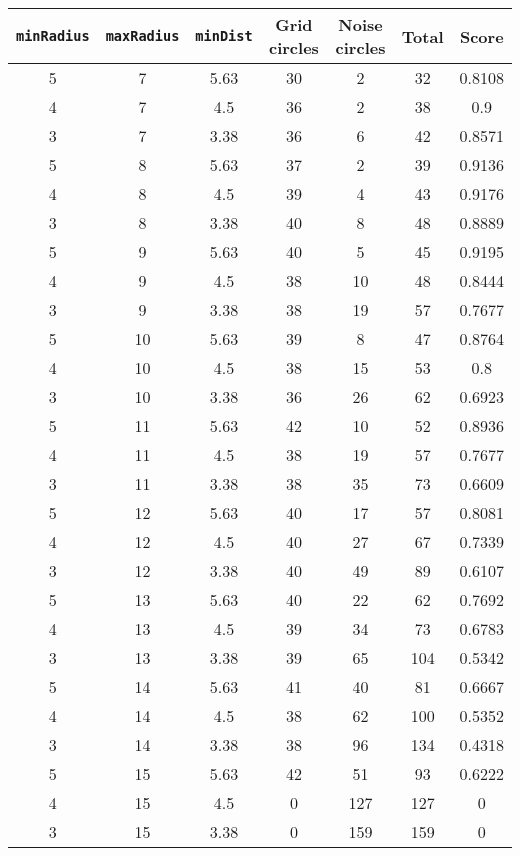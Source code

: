 \documentclass[letterpaper, 12pt]{article}
\begin{document}
\begin{longtable}{|c|c|c|c|c|c|c|}
\hline
\textbf{\texttt{minRadius}} & \textbf{\texttt{maxRadius}} & \textbf{\texttt{minDist}} & \textbf{Grid circles} & \textbf{Noise circles} & \textbf{Total} & \textbf{Score} \\
\hline
5 & 7 & 5.63 & 30 & 2 & 32 & 0.8108 \\
\hline
4 & 7 & 4.5 & 36 & 2 & 38 & 0.9 \\
\hline
3 & 7 & 3.38 & 36 & 6 & 42 & 0.8571 \\
\hline
5 & 8 & 5.63 & 37 & 2 & 39 & 0.9136 \\
\hline
4 & 8 & 4.5 & 39 & 4 & 43 & 0.9176 \\
\hline
3 & 8 & 3.38 & 40 & 8 & 48 & 0.8889 \\
\hline
5 & 9 & 5.63 & 40 & 5 & 45 & 0.9195 \\
\hline
4 & 9 & 4.5 & 38 & 10 & 48 & 0.8444 \\
\hline
3 & 9 & 3.38 & 38 & 19 & 57 & 0.7677 \\
\hline
5 & 10 & 5.63 & 39 & 8 & 47 & 0.8764 \\
\hline
4 & 10 & 4.5 & 38 & 15 & 53 & 0.8 \\
\hline
3 & 10 & 3.38 & 36 & 26 & 62 & 0.6923 \\
\hline
5 & 11 & 5.63 & 42 & 10 & 52 & 0.8936 \\
\hline
4 & 11 & 4.5 & 38 & 19 & 57 & 0.7677 \\
\hline
3 & 11 & 3.38 & 38 & 35 & 73 & 0.6609 \\
\hline
5 & 12 & 5.63 & 40 & 17 & 57 & 0.8081 \\
\hline
4 & 12 & 4.5 & 40 & 27 & 67 & 0.7339 \\
\hline
3 & 12 & 3.38 & 40 & 49 & 89 & 0.6107 \\
\hline
5 & 13 & 5.63 & 40 & 22 & 62 & 0.7692 \\
\hline
4 & 13 & 4.5 & 39 & 34 & 73 & 0.6783 \\
\hline
3 & 13 & 3.38 & 39 & 65 & 104 & 0.5342 \\
\hline
5 & 14 & 5.63 & 41 & 40 & 81 & 0.6667 \\
\hline
4 & 14 & 4.5 & 38 & 62 & 100 & 0.5352 \\
\hline
3 & 14 & 3.38 & 38 & 96 & 134 & 0.4318 \\
\hline
5 & 15 & 5.63 & 42 & 51 & 93 & 0.6222 \\
\hline
4 & 15 & 4.5 & 0 & 127 & 127 & 0 \\
\hline
3 & 15 & 3.38 & 0 & 159 & 159 & 0 \\

\end{longtable}
\end{document}
